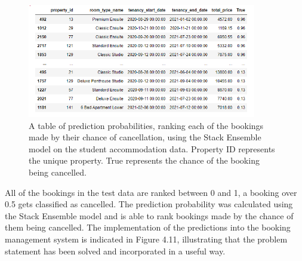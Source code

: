 \begin{figure}[H]
 \centering
 \includegraphics[width=10cm]{figures/canc_prob.png}
 \caption{A table of prediction probabilities, ranking each of the bookings made by their chance of cancellation, using the Stack Ensemble model on the student accommodation data. Property ID represents the unique property. True represents the chance of the booking being cancelled.}
\end{figure}
All of the bookings in the test data are ranked between 0 and 1, a booking over 0.5 gets classified as cancelled. The prediction probability was calculated using the Stack Ensemble model and is able to rank bookings made by the chance of them being cancelled. The implementation of the predictions into the booking management system is indicated in Figure 4.11, illustrating that the problem statement has been solved and incorporated in a useful way. 



